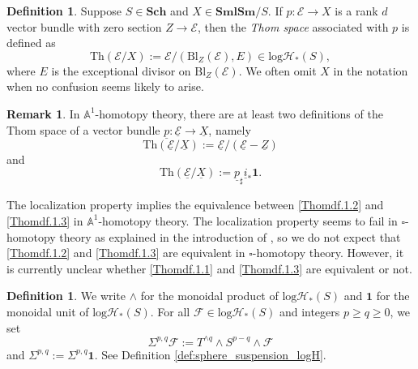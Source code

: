\documentclass[11pt, a4paper]{amsart}
\theoremstyle{definition}
\newtheorem{df}[thm]{Definition}
\newtheorem{rmk}[thm]{Remark}
\numberwithin{equation}{subsection}
\newcommand{\A}{\mathbb{A}}
\newcommand{\Sch}{\mathbf{Sch}}
\newcommand{\SmlSm}{\mathbf{SmlSm}}
\newcommand{\Blow}{{\mathrm{Bl}}}
\newcommand{\Thom}{\mathrm{Th}}
\renewcommand{\ul}{\underline}
\newcommand{\cE}{\mathcal{E}}
\newcommand{\cF}{\mathcal{F}}
\newcommand{\boxx}{\square}
\newcommand{\one}{\mathbf{1}}
\newcommand{\inflogHpt}{\mathrm{log}\mathcal{H}_\ast}
\begin{document}
\begin{df}
\label{Thomdf.1}
Suppose $S\in \Sch$ and $X\in \SmlSm/S$.
If $p\colon \cE\to X$ is a rank $d$ vector bundle with zero section $Z\to \cE$,
then the \emph{Thom space}\index[notation]{Thom @ $\Thom(\cE/X)$} associated with $p$ is defined as
\begin{equation}
\label{Thomdf.1.1}
\Thom(\cE/X)
:=
\cE/(\Blow_Z(\cE),E)\in \inflogHpt(S),
\end{equation}
where $E$ is the exceptional divisor on $\Blow_Z(\cE)$.
We often omit $X$ in the notation when no confusion seems likely to arise.
\end{df}

\begin{rmk}
In $\A^1$-homotopy theory, 
there are at least two definitions of the Thom space of a vector bundle $\ul{p}\colon \ul{\cE}\to \ul{X}$, 
namely 
\begin{equation}
\label{Thomdf.1.2}
\Thom(\ul{\cE}/\ul{X})
:=
\ul{\cE}/(\ul{\cE}-\ul{Z})
\end{equation}
and
\begin{equation}
\label{Thomdf.1.3}
\Thom(\ul{\cE}/\ul{X})
:=
\ul{p}_\sharp \ul{i}_* \one.
\end{equation}

The localization property \cite[Theorem 2.21, p.\ 114]{MV} 
implies the equivalence between \eqref{Thomdf.1.2} and \eqref{Thomdf.1.3} in $\A^1$-homotopy theory.
The localization property 
seems to fail in $\boxx$-homotopy theory as explained in the introduction of \cite{logA1}, 
so we do not expect that \eqref{Thomdf.1.2} and \eqref{Thomdf.1.3} are equivalent in $\boxx$-homotopy theory.
However, 
it is currently unclear whether \eqref{Thomdf.1.1} and \eqref{Thomdf.1.3} are equivalent or not.
\vspace{0.1in}
\end{rmk}
\begin{df}
We write $\wedge$ for the monoidal product of $\inflogHpt(S)$ and $\one$ for the monoidal unit of $\inflogHpt(S)$.
For all $\cF\in \inflogHpt(S)$ and integers $p\geq q\geq 0$, we set
\[
\Sigma^{p,q}\cF
:=
T^{\wedge q}\wedge S^{p-q}\wedge \cF
\]
and $\Sigma^{p,q}:=\Sigma^{p,q}\one$. See Definition \ref{def:sphere_suspension_logH}.
\end{df}
\end{document}
